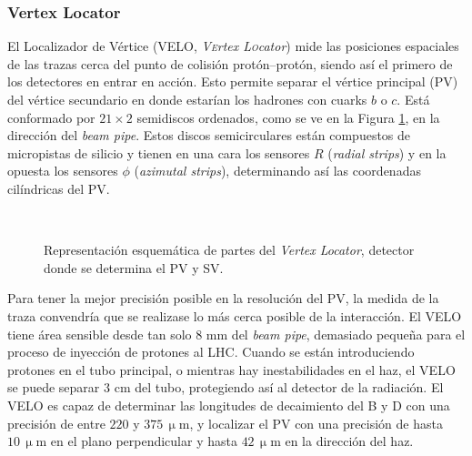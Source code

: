 \subsubsection{Vertex Locator}  %

El Localizador de Vértice (VELO, \emph{\textsc{Ve}rtex \textsc{Lo}cator}) mide las posiciones espaciales de las trazas cerca del punto de colisión protón--protón, siendo así el primero de los detectores en entrar en acción. Esto permite separar el vértice principal (PV) del vértice secundario en donde estarían los hadrones con cuarks $b$ o $c$.
Está conformado por $21 \times 2$ semidiscos ordenados, como se ve en la Figura \ref{fig_velo}, en la dirección del \textit{beam pipe}. Estos discos semicirculares están compuestos de micropistas de silicio y tienen en una cara los sensores $R$ (\emph{radial strips}) y en la opuesta los sensores $\phi$ (\emph{azimutal strips}), determinando así las coordenadas cilíndricas del PV. 

\vspace*{-0.5cm}

\begin{figure}[H]
\centering
{} \hfill
{}
 \\ 
 
 \hfill
\caption{Representación esquemática de partes del \emph{Vertex Locator}, detector donde se determina el PV y SV.} \label{fig_velo}
\end{figure}


Para tener la mejor precisión posible en la resolución del PV, la medida de la traza convendría que se realizase lo más cerca posible de la interacción. El VELO tiene área sensible desde tan solo $8$ mm del \emph{beam pipe}, demasiado pequeña para el proceso de inyección de protones al LHC. Cuando se están introduciendo protones en el tubo principal, o mientras hay inestabilidades en el haz, el VELO se puede separar $3$ cm del tubo, protegiendo así al detector de la radiación. El VELO es capaz de determinar las longitudes de decaimiento del B y D con una precisión de entre $220$ y $375 \,\upmu$m, y localizar el PV con una precisión de hasta $10 \, \upmu$m en el plano perpendicular y hasta $42 \,\upmu$m en la dirección del haz.
 
